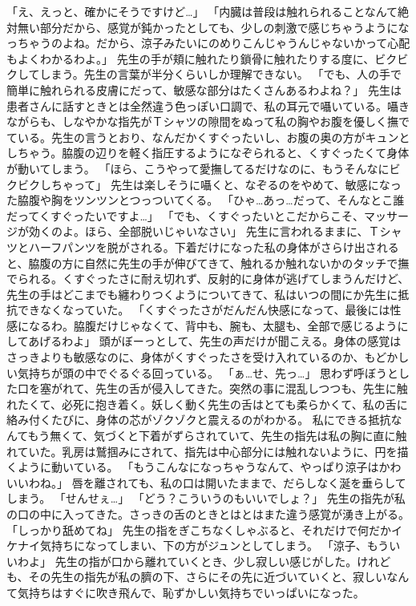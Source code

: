 「え、えっと、確かにそうですけど…」
「内臓は普段は触れられることなんて絶対無い部分だから、感覚が鈍かったとしても、少しの刺激で感じちゃうようになっちゃうのよね。だから、涼子みたいにのめりこんじゃうんじゃないかって心配もよくわかるわよ。」
先生の手が頬に触れたり鎖骨に触れたりする度に、ビクビクしてしまう。先生の言葉が半分くらいしか理解できない。
「でも、人の手で簡単に触れられる皮膚にだって、敏感な部分はたくさんあるわよね？」
先生は患者さんに話すときとは全然違う色っぽい口調で、私の耳元で囁いている。囁きながらも、しなやかな指先がＴシャツの隙間をぬって私の胸やお腹を優しく撫でている。先生の言うとおり、なんだかくすぐったいし、お腹の奥の方がキュンとしちゃう。脇腹の辺りを軽く指圧するようになぞられると、くすぐったくて身体が動いてしまう。
「ほら、こうやって愛撫してるだけなのに、もうそんなにビクビクしちゃって」
先生は楽しそうに囁くと、なぞるのをやめて、敏感になった脇腹や胸をツンツンとつっついてくる。
「ひゃ…あっ…だって、そんなとこ誰だってくすぐったいですよ…」
「でも、くすぐったいとこだからこそ、マッサージが効くのよ。ほら、全部脱いじゃいなさい」
先生に言われるままに、Ｔシャツとハーフパンツを脱がされる。下着だけになった私の身体がさらけ出されると、脇腹の方に自然に先生の手が伸びてきて、触れるか触れないかのタッチで撫でられる。くすぐったさに耐え切れず、反射的に身体が逃げてしまうんだけど、先生の手はどこまでも纏わりつくようについてきて、私はいつの間にか先生に抵抗できなくなっていた。
「くすぐったさがだんだん快感になって、最後には性感になるわ。脇腹だけじゃなくて、背中も、腕も、太腿も、全部で感じるようにしてあげるわよ」
頭がぼーっとして、先生の声だけが聞こえる。身体の感覚はさっきよりも敏感なのに、身体がくすぐったさを受け入れているのか、もどかしい気持ちが頭の中でぐるぐる回っている。
「ぁ…せ、先っ…」
思わず呼ぼうとした口を塞がれて、先生の舌が侵入してきた。突然の事に混乱しつつも、先生に触れたくて、必死に抱き着く。妖しく動く先生の舌はとても柔らかくて、私の舌に絡み付くたびに、身体の芯がゾクゾクと震えるのがわかる。
私にできる抵抗なんてもう無くて、気づくと下着がずらされていて、先生の指先は私の胸に直に触れていた。乳房は鷲掴みにされて、指先は中心部分には触れないように、円を描くように動いている。
「もうこんなになっちゃうなんて、やっぱり涼子はかわいいわね。」
唇を離されても、私の口は開いたままで、だらしなく涎を垂らしてしまう。
「せんせぇ…」
「どう？こういうのもいいでしょ？」
先生の指先が私の口の中に入ってきた。さっきの舌のときとはとはまた違う感覚が湧き上がる。
「しっかり舐めてね」
先生の指をぎこちなくしゃぶると、それだけで何だかイケナイ気持ちになってしまい、下の方がジュンとしてしまう。
「涼子、もういいわよ」
先生の指が口から離れていくとき、少し寂しい感じがした。けれども、その先生の指先が私の臍の下、さらにその先に近づいていくと、寂しいなんて気持ちはすぐに吹き飛んで、恥ずかしい気持ちでいっぱいになった。
